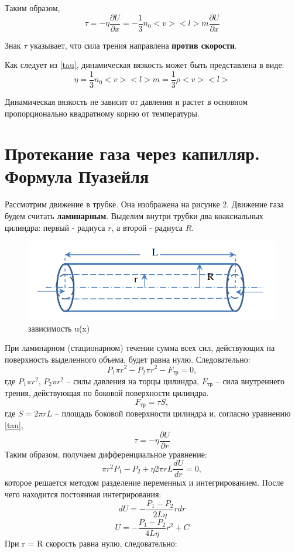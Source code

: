 \documentclass[a4paper,12pt]{article}
\begin{document}
Таким образом, 
\begin{equation}\label{tau}
\tau = -\eta\frac{\partial U}{\partial x} = -\frac{1}{3}n_0<v><l>m\frac{\partial U}{\partial x}
\end{equation}

Знак $\tau$ указывает, что сила трения направлена \textbf{против скорости}.

Как следует из \eqref{tau}, динамическая вязкость может быть представлена в виде:
\begin{equation}\label{tau}
\eta = \frac{1}{3}n_0<v><l>m = \frac{1}{3}\rho<v><l>
\end{equation}

Динамическая вязкость не зависит от давления и растет в основном пропорционально квадратному корню от температуры.

\newpage
\section{Протекание газа через капилляр. Формула Пуазейля}
Рассмотрим движение в трубке. Она изображена на рисунке 2. Движение газа будем считать \textbf{ламинарным}. Выделим внутри трубки два коаксиальных цилиндра: первый - радиуса $r$, а второй - радиуса $R$.

\begin{figure}[h!]
	\begin{center}
		\includegraphics[scale=0.7]{2}
	\end{center}
	\caption{зависимость u(x)}
\end{figure}

При ламинарном (стационарном) течении сумма всех сил, действующих на поверхность выделенного объема, будет равна нулю. Следовательно:
$$P_1\pi r^2 - P_2\pi r^2 - F_{тр}= 0,$$
где $P_1\pi r^2$, $P_2\pi r^2$ -- силы давления на торцы цилиндра, $F_{тр}$ -- сила внутреннего трения, действующая по боковой поверхности цилиндра.
$$F_{тр} = \tau S,$$
где $S = 2\pi rL$ -- площадь боковой поверхности цилиндра и, согласно уравнению \eqref{tau},
$$\tau = -\eta\frac{\partial U}{\partial r}$$
Таким образом, получаем дифференциальное уравнение:
$$\pi r^2P_1 - P_2 + \eta2\pi rL\frac{dU}{dr} = 0,$$
которое решается методом разделение переменных и интегрированием. После чего находится постоянная интегрирования:
$$dU = -\frac{P_1 - P_2}{2L\eta}rdr$$
$$U = -\frac{P_1 - P_2}{4L\eta}r^2 + C$$
При r = R скорость равна нулю, следовательно:
\end{document}
